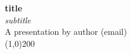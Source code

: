 \documentclass[pdftex,a4paper,12pt]{report}
\begin{document}
\begin{center}
    \large\textbf{{{title}}}\\
    \emph{{{subtitle}}}\\[0.5cm]
    \normalsize A presentation by {{author}} ({{email}})\\
  \line(1,0){200}\\[0.5cm] 
\end{center}
\end{document}
